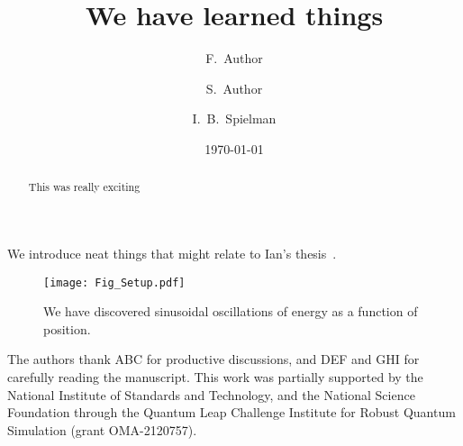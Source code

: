 \documentclass[aps,prl,twocolumn,showpacs,superscriptaddress,floatfix]{revtex4-1}
\begin{document}
\title{We have learned things}
\author{F.~Author}
\author{S.~Author}
\author{I.~B.~Spielman}
\date{\today}

\begin{abstract}
This was really exciting
\end{abstract}

\maketitle


We introduce neat things that might relate to Ian's thesis~\cite{Spielman2004}.


\begin{figure}[t]
\texttt{[image: Fig\_Setup.pdf]}
\caption{We have discovered sinusoidal oscillations of energy as a function of position.}
\label{Fig_Setup}
\end{figure}



\begin{acknowledgments}
The authors thank ABC for productive discussions, and DEF and GHI for carefully reading the manuscript.
This work was partially supported by the National Institute of Standards and Technology, and the National Science Foundation through the Quantum Leap Challenge Institute for Robust Quantum Simulation (grant OMA-2120757).
\end{acknowledgments} 


\end{document}
